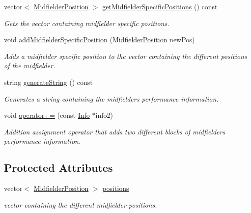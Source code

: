 \begin{DoxyCompactItemize}
vector$<$ \hyperlink{_utils_8hpp_a9f9328fe291d23e820ad594679abd217}{Midfielder\+Position} $>$ \hyperlink{class_info_m_f_a1f91cbfd828fdfd6970a3b91b5c04945}{get\+Midfielder\+Specific\+Positions} () const
\begin{DoxyCompactList}\small\item\em Gets the vector containing midfielder specific positions. \end{DoxyCompactList}\item 
void \hyperlink{class_info_m_f_a9b6f1e8cd28291746e3bf51863e1c7b0}{add\+Midfielder\+Specific\+Position} (\hyperlink{_utils_8hpp_a9f9328fe291d23e820ad594679abd217}{Midfielder\+Position} new\+Pos)
\begin{DoxyCompactList}\small\item\em Adds a midfielder specific position to the vector containing the different positions of the midfielder. \end{DoxyCompactList}\item 
string \hyperlink{class_info_m_f_ac61b01c6bfed2c31bd4ddbc2baba097d}{generate\+String} () const
\begin{DoxyCompactList}\small\item\em Generates a string containing the midfielder\textquotesingle{}s performance information. \end{DoxyCompactList}\item 
void \hyperlink{class_info_m_f_a937a1514afaedfa94b2f5372f91edce5}{operator+=} (const \hyperlink{class_info}{Info} $\ast$info2)
\begin{DoxyCompactList}\small\item\em Addition assignment operator that adds two different blocks of midfielder\textquotesingle{}s performance information. \end{DoxyCompactList}\end{DoxyCompactItemize}
\subsection*{Protected Attributes}
\begin{DoxyCompactItemize}
\item 
vector$<$ \hyperlink{_utils_8hpp_a9f9328fe291d23e820ad594679abd217}{Midfielder\+Position} $>$ \hyperlink{class_info_m_f_ac0ef77d22b8f5c008b8f66034ad0bd81}{positions}
\begin{DoxyCompactList}\small\item\em vector containing the different midfielder positions. \end{DoxyCompactList}\end{DoxyCompactItemize}


